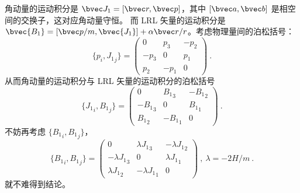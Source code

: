 角动量的运动积分是 $\bvec J_1 = [\bvec r, \bvec p]$，其中 $[\bvec a, \bvec b]$ 是相空间的交换子，这对应角动量守恒。
而 LRL 矢量的运动积分是 $\bvec{B_1} = [\bvec p/m, \bvec{J_1}] + \alpha \bvec r / r$。考虑物理量间的泊松括号：
\begin{equation}
\{p_i, {J_1}_{j}\} = \begin{pmatrix}
0 & p_3 & -p_2 \\
-p_3 & 0 & p_1 \\
p_2 & -p_1 & 0
\end{pmatrix}~.
\end{equation}
从而角动量的运动积分与 LRL 矢量的运动积分的泊松括号
\begin{equation}
\{{J_1}_i, {B_1}_j\} = \begin{pmatrix}
0 & {B_1}_3 & -{B_1}_2 \\
-{B_1}_3 & 0 & {B_1}_1 \\
{B_1}_2 & -{B_1}_1 & 0 
\end{pmatrix} ~.
\end{equation}
不妨再考虑 $\{{B_1}_i, {B_1}_j\}$，
\begin{equation}
\{{B_1}_i, {B_1}_j\} = \begin{pmatrix}
0 & \lambda {J_1}_3 & -\lambda {J_1}_2 \\
-\lambda {J_1}_3 & 0 & \lambda {J_1}_1 \\
\lambda {J_1}_2 & -\lambda {J_1}_1 & 0 
\end{pmatrix}~,\ \lambda = -2H/m ~.
\end{equation}
就不难得到结论。